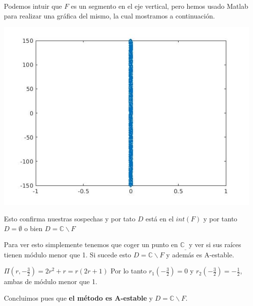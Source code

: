 \documentclass[a4paper,11pt,spanish,leqno]{article}
\begin{document}
Podemos intuir que $F$ es un segmento en el eje vertical, pero hemos usado Matlab para realizar una gráfica del mismo, la cual mostramos a continuación.

\includegraphics[scale=0.5]{Entrega8.jpg}

Esto confirma nuestras sospechas y por tato $D$ está en el $int(F)$ y por tanto $D= \emptyset $ o bien $D=\mathbb{C} \backslash F$

Para ver esto simplemente tenemos que coger un punto en $\mathbb{C}_{\_}$ y ver si sus raíces tienen módulo menor que 1. Si sucede esto $D=\mathbb{C} \backslash F$ y además es A-estable.

$\Pi(r,-\frac{3}{2}) = 2r^2 + r = r(2r + 1)$ Por lo tanto $r_1(-\frac{3}{2})=0$ y $r_2(-\frac{3}{2})=-\frac{1}{2}$, ambas de módulo menor que 1.

Concluimos pues que \textbf{el método es A-estable} y \textbf{$D=\mathbb{C} \backslash F$}.
\end{document}
